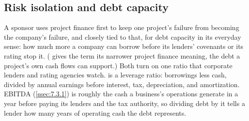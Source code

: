 \subsection{Risk isolation and debt capacity}\label{ssec:2.5.1}

A sponsor uses project finance first to keep one project's failure from becoming the company's failure, and closely tied to that, for debt capacity in its everyday sense: how much more a company can borrow before its lenders' covenants or its rating stop it. ( gives the term its narrower project finance meaning, the debt a project's own cash flows can support.) Both turn on one ratio that corporate lenders and rating agencies watch.  is a leverage ratio: borrowings less cash, divided by annual earnings before interest, tax, depreciation, and amortization. EBITDA (\cref{ssec:7.3.1}) is roughly the cash a business's operations generate in a year before paying its lenders and the tax authority, so dividing debt by it tells a lender how many years of operating cash the debt represents.

